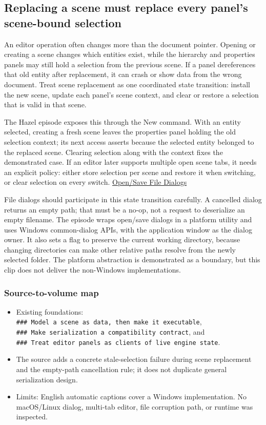 \subsection{Replacing a scene must replace every panel's scene-bound selection}\label{06-engine-ii-ch032-replacing-a-scene-must-replace-every-panels-scene-bound-selection}

An editor operation often changes more than the document pointer. Opening or creating a scene changes which entities exist, while the hierarchy and properties panels may still hold a selection from the previous scene. If a panel dereferences that old entity after replacement, it can crash or show data from the wrong document. Treat scene replacement as one coordinated state transition: install the new scene, update each panel's scene context, and clear or restore a selection that is valid in that scene.

The Hazel episode exposes this through the New command. With an entity selected, creating a fresh scene leaves the properties panel holding the old selection context; its next access asserts because the selected entity belonged to the replaced scene. Clearing selection along with the context fixes the demonstrated case. If an editor later supports multiple open scene tabs, it needs an explicit policy: either store selection per scene and restore it when switching, or clear selection on every switch. \href{https://www.youtube.com/watch?v=zn7N7zHgCcs}{Open/Save File Dialogs}

File dialogs should participate in this state transition carefully. A cancelled dialog returns an empty path; that must be a no-op, not a request to deserialize an empty filename. The episode wraps open/save dialogs in a platform utility and uses Windows common-dialog APIs, with the application window as the dialog owner. It also sets a flag to preserve the current working directory, because changing directories can make other relative paths resolve from the newly selected folder. The platform abstraction is demonstrated as a boundary, but this clip does not deliver the non-Windows implementations.

\subsubsection{Source-to-volume map}\label{06-engine-ii-ch032-source-to-volume-map-1}

\begin{itemize}
\tightlist
\item
  Existing foundations: \texttt{\#\#\#\ Model\ a\ scene\ as\ data,\ then\ make\ it\ executable}, \texttt{\#\#\#\ Make\ serialization\ a\ compatibility\ contract}, and \texttt{\#\#\#\ Treat\ editor\ panels\ as\ clients\ of\ live\ engine\ state}.
\item
  The source adds a concrete stale-selection failure during scene replacement and the empty-path cancellation rule; it does not duplicate general serialization design.
\item
  Limits: English automatic captions cover a Windows implementation. No macOS/Linux dialog, multi-tab editor, file corruption path, or runtime was inspected.
\end{itemize}

